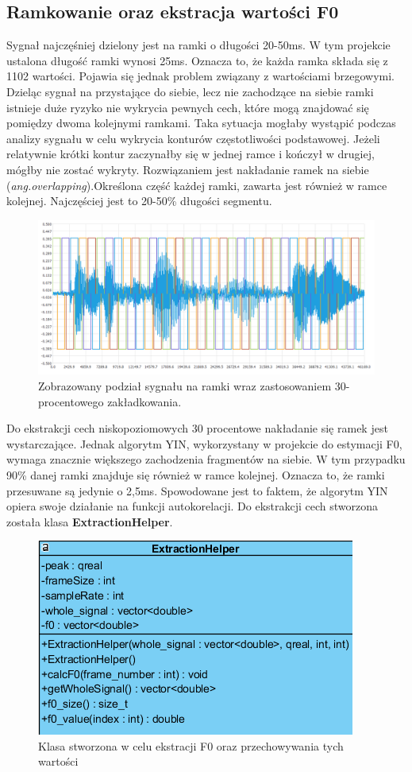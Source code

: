 \documentclass[a4paper,12 pt]{report}
\begin{document}
\subsection{Ramkowanie oraz ekstracja wartości F0}
Sygnał najczęśniej dzielony jest na ramki o długości 20-50ms. W tym projekcie ustalona długość ramki wynosi 25ms. Oznacza to, że każda ramka składa się z 1102 wartości.
Pojawia się jednak problem związany z wartościami brzegowymi. Dzieląc sygnał na przystające do siebie, lecz nie zachodzące na siebie ramki istnieje duże ryzyko nie wykrycia pewnych cech, które mogą znajdować się pomiędzy dwoma kolejnymi ramkami. 
Taka sytuacja mogłaby wystąpić podczas analizy sygnału w celu wykrycia konturów częstotliwości podstawowej. Jeżeli relatywnie krótki kontur zaczynałby się w jednej ramce i kończył w drugiej, mógłby nie zostać wykryty.
Rozwiązaniem jest nakładanie ramek na siebie (\textit{ang.overlapping}).Określona część każdej ramki, zawarta jest również w ramce kolejnej. Najczęściej jest to 20-50\% długości segmentu.
\begin{figure}[h]
\includegraphics[scale=0.6]{overlapping.png}
\caption{Zobrazowany podział sygnału na ramki wraz zastosowaniem 30-procentowego zakładkowania.}
\end{figure}
\FloatBarrier
Do ekstrakcji cech niskopoziomowych 30 procentowe nakładanie się ramek jest wystarczające. Jednak algorytm YIN, wykorzystany w projekcie do estymacji F0, wymaga znacznie większego zachodzenia fragmentów na siebie. W tym przypadku 90\% danej ramki znajduje się również w ramce kolejnej.
Oznacza to, że ramki przesuwane są jedynie o 2,5ms. Spowodowane jest to faktem, że algorytm YIN opiera swoje działanie na funkcji autokorelacji.
Do ekstrakcji cech stworzona została klasa \textbf{ExtractionHelper}.
\FloatBarrier
\begin{figure}[h]
\centering
\includegraphics[scale=0.9]{featuresExtractor.png}
\caption{Klasa stworzona w celu ekstracji F0 oraz przechowywania tych wartości}
\end{figure}
\end{document}
